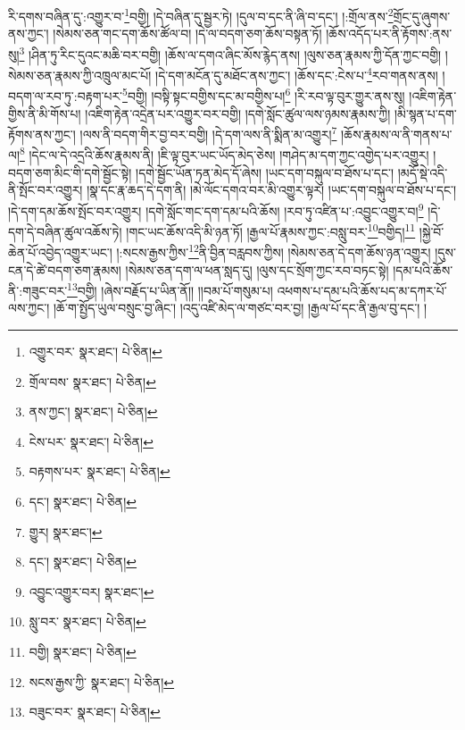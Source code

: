 རི་དགས་བཞིན་དུ་:འགྱུར་བ་\footnote{འགྱུར་བར་  སྣར་ཐང་།  པེ་ཅིན། }བགྱི། །དེ་བཞིན་དུ་སྦྱར་ཏེ། །དུལ་བ་དང་ནི་ཞི་བ་དང་། །:གྲོལ་ནས་\footnote{གྲོལ་བས་  སྣར་ཐང་།  པེ་ཅིན། }གྲོང་དུ་ཞུགས་ནས་ཀྱང་། །སེམས་ཅན་གང་དག་ཆོས་ཚོལ་བ། །དེ་ལ་བདག་ཅག་ཆོས་བསྟན་ཏོ། །ཆོས་འདོད་པར་ནི་རྟོགས་:ནས་སུ།\footnote{ནས་ཀྱང་།  སྣར་ཐང་།  པེ་ཅིན། } །ཤིན་ཏུ་རིང་དུའང་མཆི་བར་བགྱི། །ཆོས་ལ་དགའ་ཞིང་མོས་རྙེད་ནས། །ལུས་ཅན་རྣམས་ཀྱི་དོན་ཀྱང་བགྱི། །སེམས་ཅན་རྣམས་ཀྱི་འཁྲུལ་མང་པོ། །དེ་དག་མངོན་དུ་མཐོང་ནས་ཀྱང་། །ཆོས་དང་:ངེས་པ་\footnote{ངེས་པར་  སྣར་ཐང་།  པེ་ཅིན། }རབ་གནས་ནས། །བདག་ལ་རབ་ཏུ་:བརྟག་པར་\footnote{བརྟགས་པར་  སྣར་ཐང་།  པེ་ཅིན། }བགྱི། །བསྟི་སྟང་བགྱིས་དང་མ་བགྱིས་པ།\footnote{དང་།  སྣར་ཐང་།  པེ་ཅིན། } །རི་རབ་ལྟ་བུར་གྱུར་ནས་སུ། །འཇིག་རྟེན་གྱིས་ནི་མི་གོས་པ། །འཇིག་རྟེན་འདྲེན་པར་འགྱུར་བར་བགྱི། །དགེ་སློང་ཚུལ་ལས་ཉམས་རྣམས་ཀྱི། །མི་སྙན་པ་དག་རྟོགས་ནས་ཀྱང་། །ལས་ནི་བདག་གིར་བྱ་བར་བགྱི། །དེ་དག་ལས་ནི་སྨིན་མ་འགྱུར།\footnote{གྱུར།  སྣར་ཐང་། } །ཆོས་རྣམས་ལ་ནི་གནས་པ་ལ།\footnote{དང་།  སྣར་ཐང་།  པེ་ཅིན། } །དེང་ལ་དེ་འདྲའི་ཆོས་རྣམས་ནི། །ཇི་ལྟ་བུར་ཡང་ཡོད་མེད་ཅེས། །གཤེད་མ་དག་ཀྱང་འགྱེད་པར་འགྱུར། །བདག་ཅག་མིང་གི་དགེ་སྦྱོང་སྟེ། །དགེ་སྦྱོང་ཡོན་ཏན་མེད་དོ་ཞེས། །ཡང་དག་བསྐུལ་བ་ཐོས་པ་དང་། །མདོ་སྡེ་འདི་ནི་སྤོང་བར་འགྱུར། །སྣ་དང་རྣ་ཆད་དེ་དག་ནི། །མེ་ལོང་དགའ་བར་མི་འགྱུར་ལྟར། །ཡང་དག་བསྐུལ་བ་ཐོས་པ་དང་། །དེ་དག་དམ་ཆོས་སྤོང་བར་འགྱུར། །དགེ་སློང་གང་དག་དམ་པའི་ཆོས། །རབ་ཏུ་འཛིན་པ་:འབྱུང་འགྱུར་བ།\footnote{འབྱུང་འགྱུར་བར།  སྣར་ཐང་། } །དེ་དག་དེ་བཞིན་ཚུལ་འཆོས་ཏེ། །གང་ཡང་ཆོས་འདི་མི་ཉན་ཏོ། །རྒྱལ་པོ་རྣམས་ཀྱང་:བསླུ་བར་\footnote{སླུ་བར་  སྣར་ཐང་།  པེ་ཅིན། }བགྱིད།\footnote{བགྱི།  སྣར་ཐང་།  པེ་ཅིན། } །སྐྱེ་བོ་ཆེན་པོ་འབྱེད་འགྱུར་ཡང་། །:སངས་རྒྱས་ཀྱིས་\footnote{སངས་རྒྱས་ཀྱི་  སྣར་ཐང་།  པེ་ཅིན། }ནི་བྱིན་བརླབས་ཀྱིས། །སེམས་ཅན་དེ་དག་ཆོས་ཉན་འགྱུར། །དུས་ངན་དེ་ཚེ་བདག་ཅག་རྣམས། །སེམས་ཅན་དག་ལ་ཕན་སླད་དུ། །ལུས་དང་སྲོག་ཀྱང་རབ་བཏང་སྟེ། །དམ་པའི་ཆོས་ནི་:གཟུང་བར་\footnote{བཟུང་བར་  སྣར་ཐང་།  པེ་ཅིན། }བགྱི། །ཞེས་བརྗོད་པ་ཡིན་ནོ།། །།བམ་པོ་གསུམ་པ། འཕགས་པ་དམ་པའི་ཆོས་པད་མ་དཀར་པོ་ལས་ཀྱང་། །ཆོ་ག་སྤྱོད་ཡུལ་བསྲུང་བྱ་ཞིང་། །འདུ་འཛི་མེད་ལ་གཙང་བར་བྱ། །རྒྱལ་པོ་དང་ནི་རྒྱལ་བུ་དང་། །
